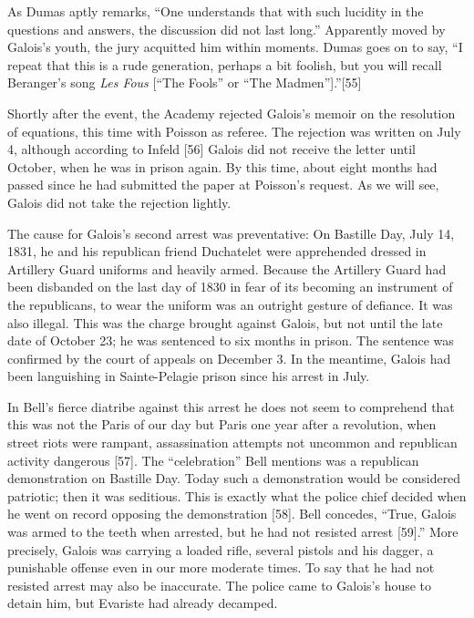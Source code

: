 \documentclass[12pt]{article}
\begin{document}
As Dumas aptly remarks, ``One understands that with such lucidity in the questions and answers, the discussion did not last long.'' Apparently moved by Galois's youth, the jury acquitted him within moments. Dumas goes on to say, ``I repeat that this is a rude generation, perhaps a bit foolish, but you will recall Beranger's song \emph{Les Fous} [``The Fools'' or ``The Madmen''].''[55]

Shortly after the event, the Academy rejected Galois's memoir on the resolution of equations, this time with Poisson as referee. The rejection was written on July 4, although according to Infeld [56] Galois did not receive the letter until October, when he was in prison again. By this time, about eight months had passed since he had submitted the paper at Poisson's request. As we will see, Galois did not take the rejection lightly.

The cause for Galois's second arrest was preventative: On Bastille Day, July 14, 1831, he and his republican friend Duchatelet were apprehended dressed in Artillery Guard uniforms and heavily armed. Because the Artillery Guard had been disbanded on the last day of 1830 in fear of its becoming an instrument of the republicans, to wear the uniform was an outright gesture of defiance. It was also illegal. This was the charge brought against Galois, but not until the late date of October 23; he was sentenced to six months in prison. The sentence was confirmed by the court of appeals on December 3. In the meantime, Galois had been languishing in Sainte-Pelagie prison since his arrest in July.

In Bell's fierce diatribe against this arrest he does not seem to comprehend that this was not the Paris of our day but Paris one year after a revolution, when street riots were rampant, assassination attempts not uncommon and republican activity dangerous [57]. The ``celebration'' Bell mentions was a republican demonstration on Bastille Day. Today such a demonstration would be considered patriotic; then it was seditious. This is exactly what the police chief decided when he went on record opposing the demonstration [58]. Bell concedes, ``True, Galois was armed to the teeth when arrested, but he had not resisted arrest [59].''  More precisely, Galois was carrying a loaded rifle, several pistols and his dagger, a punishable offense even in our more moderate times. To say that he had not resisted arrest may also be inaccurate. The police came to Galois's house to detain him, but Evariste had already decamped.
\end{document}

